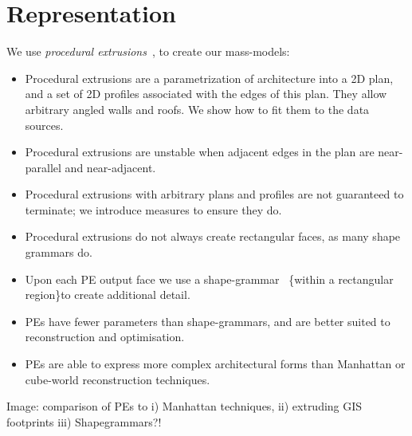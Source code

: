 
\section{Representation}
\label{sec:rep}

We use \emph{procedural extrusions}~, to create our mass-models:

\begin{itemize}
    \item Procedural extrusions are a parametrization of architecture into a 2D plan, and a set of 2D profiles associated with the edges of this plan. They allow arbitrary angled walls and roofs. We show how to fit them to the data sources.
    \item Procedural extrusions are unstable when adjacent edges in the plan are near-parallel and near-adjacent.
    \item Procedural extrusions with arbitrary plans and profiles are not guaranteed to terminate; we introduce measures to ensure they do.
    \item Procedural extrusions do not always create rectangular faces, as many shape grammars do.
    \item Upon each PE output face we use a shape-grammar~\cite{muller2006procedural} \{within a rectangular region\}to create additional detail.
    \item PEs have fewer parameters than shape-grammars, and are better suited to reconstruction and optimisation.
    \item PEs are able to express more complex architectural forms than Manhattan or cube-world reconstruction techniques.
\end{itemize}

Image: comparison of PEs to i) Manhattan techniques, ii) extruding GIS footprints iii) Shapegrammars?!
